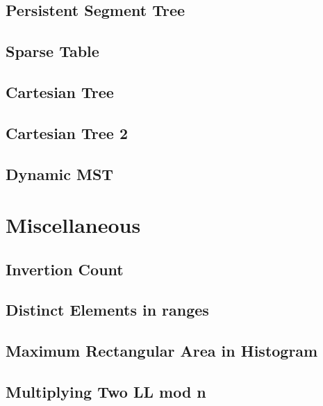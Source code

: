 \subsection{Persistent Segment Tree}
\raggedbottom
\hrulefill
\subsection{Sparse Table}
\raggedbottom
\hrulefill
\subsection{Cartesian Tree}
\raggedbottom
\hrulefill
\subsection{Cartesian Tree 2}
\raggedbottom
\hrulefill
\subsection{Dynamic MST}
\raggedbottom
\hrulefill

\section{Miscellaneous}
\subsection{Invertion Count}
\raggedbottom
\hrulefill
\subsection{Distinct Elements in ranges}
\raggedbottom
\hrulefill
\subsection{Maximum Rectangular Area in Histogram}
\raggedbottom
\hrulefill
\subsection{Multiplying Two LL mod n}
\raggedbottom
\hrulefill
